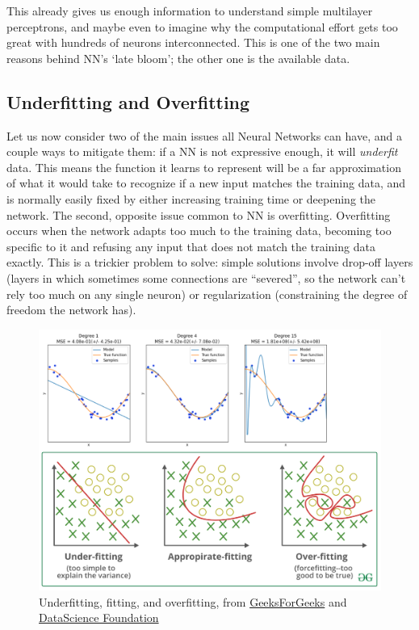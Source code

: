 \documentclass[../main.tex]{subfiles}
\begin{document}
This already gives us enough information to understand simple multilayer perceptrons, and maybe even to imagine why the computational effort gets too great with hundreds of neurons interconnected. This is one of the two main reasons behind NN's `late bloom'; the other one is the available data.

\subsection{Underfitting and Overfitting}
Let us now consider two of the main issues all Neural Networks can have, and a couple ways to mitigate them: if a NN is not expressive enough, it will \textit{underfit} data. This means the function it learns to represent will be a far approximation of what it would take to recognize if a new input matches the training data, and is normally easily fixed by either increasing training time or deepening the network. The second, opposite issue common to NN is overfitting. Overfitting occurs when the network adapts too much to the training data, becoming too specific to it and refusing any input that does not match the training data exactly. This is a trickier problem to solve: simple solutions involve drop-off layers (layers in which sometimes some connections are ``severed'', so the network can't rely too much on any single neuron) or regularization (constraining the degree of freedom the network has).

\begin{figure}[h]
    \caption{Underfitting, fitting, and overfitting, from \href{https://www.geeksforgeeks.org/underfitting-and-overfitting-in-machine-learning/}{GeeksForGeeks} and \href{https://datascience.foundation/sciencewhitepaper/underfitting-and-overfitting-in-machine-learning}{DataScience Foundation}}
    \includegraphics[width=\textwidth]{img/fitting_collage.png}
\end{figure}
\end{document}
